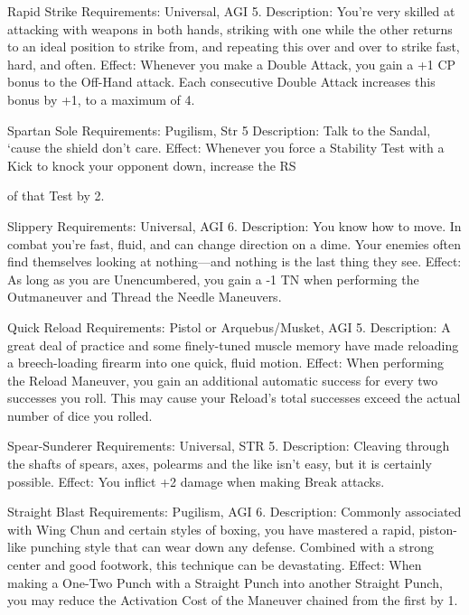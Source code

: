 \documentclass[oneside,11pt,english]{book}
\begin{document}
Rapid Strike 
Requirements: Universal, AGI 5. 
Description: You're very skilled at attacking with weapons in both hands, striking with one while the 
other returns to an ideal position to strike from, and repeating this over and over to strike fast, hard, and 
often. 
Effect: Whenever you make a Double Attack, you gain a +1 CP bonus to the Off-Hand attack. Each 
consecutive Double Attack increases this bonus by +1, to a maximum of 4. 

 

Spartan Sole 
Requirements: Pugilism, Str 5 
Description: Talk to the Sandal, ‘cause the shield don’t care. 
Effect: Whenever you force a Stability Test with a Kick to knock your opponent down, increase the RS 


of that Test by 2. 

 

Slippery 
Requirements: Universal, AGI 6. 
Description: You know how to move. In combat you're fast, fluid, and can change direction on a dime. 
Your enemies often find themselves looking at nothing—and nothing is the last thing they see. 
Effect: As long as you are Unencumbered, you gain a -1 TN when performing the Outmaneuver and 
Thread the Needle Maneuvers. 

 

 

Quick Reload 
Requirements: Pistol or Arquebus/Musket, AGI 5. 
Description: A great deal of practice and some finely-tuned muscle memory have made reloading a 
breech-loading firearm into one quick, fluid motion. 
Effect: When performing the Reload Maneuver, you gain an additional automatic success for every two 
successes you roll. This may cause your Reload’s total successes exceed the actual number of dice you 
rolled. 

 

Spear-Sunderer 
Requirements: Universal, STR 5. 
Description: Cleaving through the shafts of spears, axes, polearms and the like isn’t easy, but it is 
certainly possible. 
Effect: You inflict +2 damage when making Break attacks. 

 

Straight Blast 
Requirements: Pugilism, AGI 6. 
Description: Commonly associated with Wing Chun and certain styles of boxing, you have mastered a 
rapid, piston-like punching style that can wear down any defense. Combined with a strong center and 
good footwork, this technique can be devastating. 
Effect: When making a One-Two Punch with a Straight Punch into another Straight Punch, you may 
reduce the Activation Cost of the Maneuver chained from the first by 1. 
\end{document}
